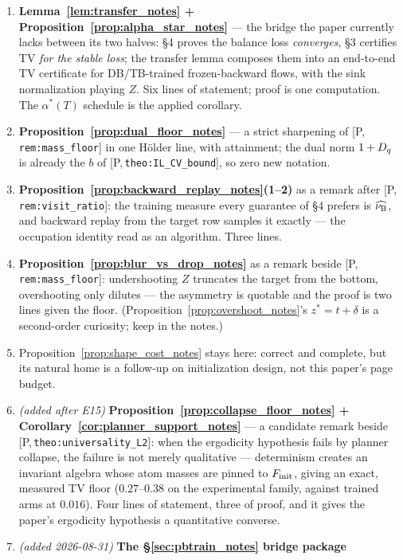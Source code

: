 \documentclass[11pt]{article}
\theoremstyle{definition}
\theoremstyle{remark}
\def\lambda{\widehat\nuB}
\newcommand{\paperref}[1]{[P,\,\texttt{#1}]}   %
\begin{document}
\begin{enumerate}
    \item \textbf{Lemma~\ref{lem:transfer_notes} + Proposition~\ref{prop:alpha_star_notes}} --- the
    bridge the paper currently lacks between its two halves: \S4 proves the balance loss
    \emph{converges}, \S3 certifies TV \emph{for the stable loss}; the transfer lemma
    composes them into an end-to-end TV certificate for DB/TB-trained frozen-backward
    flows, with the sink normalization playing $Z$. Six lines of statement; proof is one
    computation. The $\alpha^*(T)$ schedule is the applied corollary.
    \item \textbf{Proposition~\ref{prop:dual_floor_notes}} --- a strict sharpening of
    \paperref{rem:mass\_floor} in one H\"older line, with attainment; the dual norm
    $1+D_{q}$ is already the $b$ of \paperref{theo:IL\_CV\_bound}, so zero new notation.
    \item \textbf{Proposition~\ref{prop:backward_replay_notes}(1--2)} as a remark after
    \paperref{rem:visit\_ratio}: the training measure every guarantee of \S4 prefers is
    $\lambda$, and backward replay from the target row samples it exactly --- the
    occupation identity read as an algorithm. Three lines.
    \item \textbf{Proposition~\ref{prop:blur_vs_drop_notes}} as a remark beside
    \paperref{rem:mass\_floor}: undershooting $Z$ truncates the target from the bottom,
    overshooting only dilutes --- the asymmetry is quotable and the proof is two lines
    given the floor. (Proposition~\ref{prop:overshoot_notes}'s $z^*=t+\delta$ is a second-order
    curiosity; keep in the notes.)
    \item Proposition~\ref{prop:shape_cost_notes} stays here: correct and complete, but its
    natural home is a follow-up on initialization design, not this paper's page budget.
    \item \emph{(added after E15)} \textbf{Proposition~\ref{prop:collapse_floor_notes} +
    Corollary~\ref{cor:planner_support_notes}} — a candidate remark beside
    \paperref{theo:universality\_L2}: when the ergodicity hypothesis fails by planner
    collapse, the failure is not merely qualitative — determinism creates an invariant
    algebra whose atom masses are pinned to $F_{\mathrm{init}}$, giving an exact, measured TV floor
    ($0.27$--$0.38$ on the experimental family, against trained arms at $0.016$). Four
    lines of statement, three of proof, and it gives the paper's ergodicity hypothesis a
    quantitative converse.
    \item \emph{(added 2026-08-31)} \textbf{The \S\ref{sec:pbtrain_notes} bridge package}

\end{enumerate}
\end{document}
